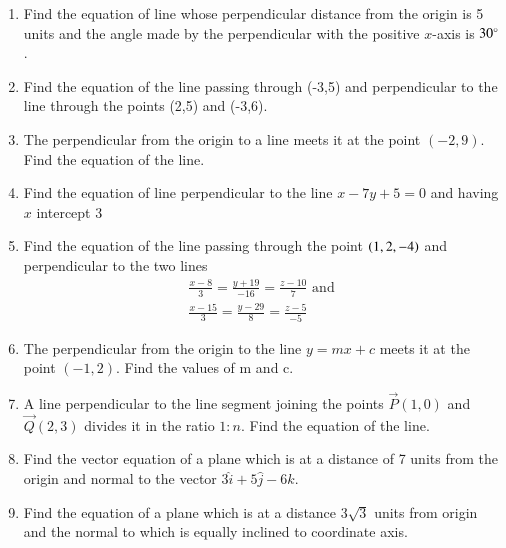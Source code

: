 \begin{enumerate}[label=\thesubsection.\arabic*,ref=\thesubsection.\theenumi]
\solution
		
\item Find the equation of line whose perpendicular distance from the origin is 5 units and the angle made by the perpendicular with the positive $x$-axis is $30\degree$.
\label{chapters/11/10/2/8}
\\
\solution

\item 
	Find the equation of the line passing through  (-3,5) and perpendicular to the line through the points (2,5) and (-3,6).
	\\
	\solution 
\label{chapters/11/10/2/10}

\item 
	The perpendicular from the origin to a line meets it at the point $(-2,9)$. Find the equation of the line.
\label{chapters/11/10/2/15}
	\\
	\solution

\item Find the equation of line perpendicular to the line $x-7y+5=0$ and having $x$ intercept $3$\\
\label{chapters/11/10/3/8}
\solution

	\item Find the equation of the line passing through the point $\left(1,2,-4\right)$ and perpendicular to the two lines
\begin{align}
	\frac{x-8}{3}=\frac{y+19}{-16}=\frac{z-10}{7} \text{ and }\\ \frac{x-15}{3}=\frac{y-29}{8}=\frac{z-5}{-5} 
\end{align}
    \solution
		
 \item The perpendicular from the origin to the line $y=mx+c$ meets it at the point $(-1,2)$. Find the values of m and c.
 \label{11.10.3.15}
	 \\
 \solution
 
\item 
A line perpendicular to the line segment joining the points $\vec{P}(1,0)$ and $\vec{Q}(2,3)$ divides it in the ratio $1:n$. Find the equation of the line.
	\\
	\solution 
\label{chapters/11/10/2/11}

\item Find the vector equation of a plane which is at a distance of 7 units from the origin and normal to the vector $3\hat{i}+5\hat{j}-6\hat{k}$.
	\\
    \solution
		
\item Find the equation of a plane which is at a distance 3$\sqrt{3}$ units from origin and the normal to which is equally inclined to coordinate axis.

\end{enumerate}

